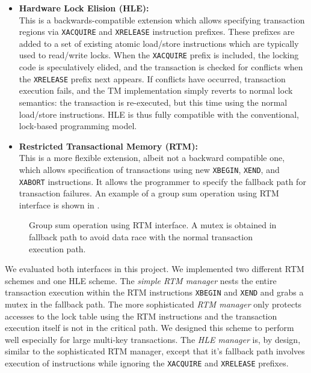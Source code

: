 \begin{itemize} 
\item \textbf{Hardware Lock Elision (HLE):} \\ This is a backwards-compatible
  extension which allows specifying transaction regions via \texttt{XACQUIRE}
  and \texttt{XRELEASE} instruction prefixes. These prefixes are added to a set
  of existing atomic load/store instructions which are typically used to
  read/write locks. When the \texttt{XACQUIRE} prefix is included, the locking
  code is speculatively elided, and the transaction is checked for conflicts
  when the \texttt{XRELEASE} prefix next appears. If conflicts have occurred,
  transaction execution fails, and the TM implementation simply reverts to
  normal lock semantics: the transaction is re-executed, but this time using the
  normal load/store instructions. HLE is thus fully compatible with the
  conventional, lock-based programming model. \\
\item \textbf{Restricted Transactional Memory (RTM):} \\ This is a more flexible
  extension, albeit not a backward compatible one, which allows specification of
  transactions using new \texttt{XBEGIN}, \texttt{XEND}, and \texttt{XABORT}
  instructions. It allows the programmer to specify the fallback path for
  transaction failures. An example of a group sum operation using RTM interface
  is shown in .\\
\end{itemize}

 \begin{figure}
    \parbox[t]{0.45\textwidth}{} \caption{Group
        sum operation using RTM interface. A mutex is obtained in fallback path
to avoid data race with the normal transaction execution path.} \label{fig:rtm}
\end{figure}

We evaluated both interfaces in this project. We implemented two different 
RTM schemes and one HLE scheme.
The \textit{simple RTM manager} nests the entire transaction execution within the RTM
instructions \texttt{XBEGIN} and \texttt{XEND} and grabs a mutex in the fallback path.
The more sophisticated \textit{RTM manager} only protects accesses to the lock table 
using the RTM instructions and the transaction execution itself is not in the critical 
path. We designed this scheme to perform well especially for large multi-key 
transactions.  
The \textit{HLE manager} is, by design, similar to the sophisticated RTM manager, except 
that it's fallback path involves execution of instructions while ignoring 
the \texttt{XACQUIRE} and \texttt{XRELEASE} prefixes.

